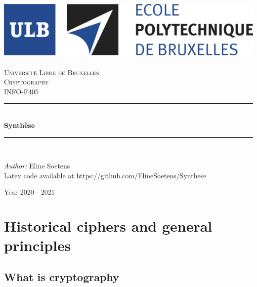 \documentclass[11pt,a4paper]{report}
\author{Eline Soetens}
\begin{document}
\begin{titlepage}
\begin{center}	
	\newcommand{\HRule}{\rule{\linewidth}{0.5mm}}  
	\includegraphics[scale=0.6]{img/logo.jpg}~\\[2cm]

	\textsc{\LARGE Université Libre de Bruxelles}\\[2cm]
	\textsc{\LARGE Cryptography}\\[0.5cm]
	\textsc{\LARGE INFO-F405}\\[1.5cm]
	
	\HRule \\[0.4cm]
	{ \huge \bfseries Synthèse \\[0.4cm] }


	\HRule \\[2cm]
		\begin{minipage}{0.5\textwidth}
		
		
		\begin{flushleft} 
		\hspace{0.25cm}
		    \textit{Author:} Eline Soetens \\\hspace{0.25 cm}
		    Latex code available at https://github.com/ElineSoetens/Synthese
		\end{flushleft}
		\end{minipage}
			\begin{minipage}{1.5\textwidth}
			
		\end{minipage}

	\vfill

{\large Year 2020 - 2021}

\end{center}
\end{titlepage}
\newpage

\tableofcontents
\newpage

\chapter{Historical ciphers and general principles}
\section{What is cryptography}
\end{document}
